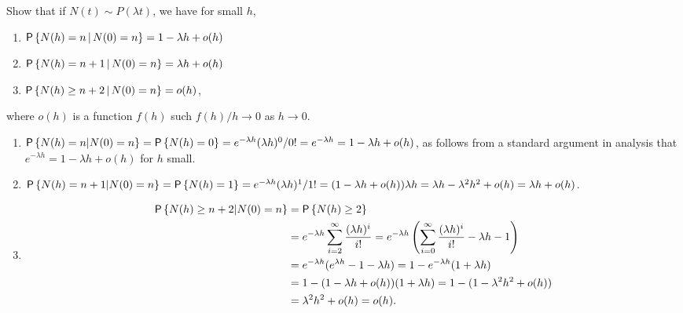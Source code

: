 \begin{question}
  Show that if $N(t) \sim P(\lambda t)$, we have for small $h$,
  \begin{enumerate}
  \item $\P{N(h) = n \given N(0) = n} = 1-\lambda h + o(h)$ 
  \item $\P{N(h) = n+1 \given N(0) = n} = \lambda h + o(h)$ 
  \item $\P{N(h) \geq n+2 \given N(0) = n} = o(h)$,
  \end{enumerate}
 where $o(h)$ is a function
    $f(h)$ such $f(h)/h \to 0$ as $h\to 0$.

    \begin{hint}
      
    \end{hint}

\begin{solution}

\begin{enumerate}
  \item 
  $\P{N(h) = n | N(0) = n} = \P{N(h) = 0} = e^{-\lambda h} (\lambda
  h)^0/0! = e^{-\lambda h} = 1-\lambda h + o(h)$,
  as follows from a standard argument in analysis that
  $e^{-\lambda h} = 1 -\lambda h + o(h)$  for $h$ small. 
\item 
  $\P{N(h) = n +1 | N(0) = n} = \P{N(h) = 1} = e^{-\lambda h} (\lambda h)^1/1! = 
(1-\lambda h + o(h))\lambda h  = \lambda h - \lambda^2 h^2 + o(h) = \lambda h + o(h)$. 
\item 
  \begin{equation*}
    \begin{split}
  \P{N(h) \geq n+2 | N(0) = n} 
&= \P{N(h) \geq 2} \\
&= e^{-\lambda h} \sum_{i=2}^\infty \frac{(\lambda h)^i}{i!} 
= e^{-\lambda h} \left(\sum_{i=0}^\infty \frac{(\lambda h)^i}{i!} - \lambda h - 1\right)\\
&= e^{-\lambda h}(e^{\lambda h} - 1 - \lambda h) 
= 1 - e^{-\lambda h}(1 + \lambda h) \\
&= 1 - (1-\lambda h + o(h))(1+\lambda h) 
= 1 - (1-\lambda^2 h^2 + o(h)) \\
&= \lambda^2 h^2 + o(h) = o(h).
    \end{split}
  \end{equation*}


\end{enumerate}
\end{solution}
\end{question}
